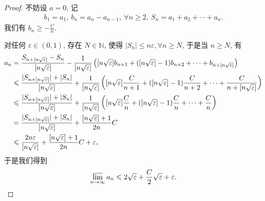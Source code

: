 \documentclass[../../main.tex]{subfiles}
\begin{document}
\begin{proof}
不妨设 $a = 0$, 记
\begin{align*}
b_1 = a_1,\ b_n = a_n - a_{n-1},\ \forall n \geqslant 2,\ S_n = a_1 + a_2 + \cdots + a_n.
\end{align*}
我们有 $b_n \geqslant -\frac{C}{n}$.

对任何 $\varepsilon \in (0,1)$, 存在 $N \in \mathbb{N}$, 使得 $|S_n| \leqslant n \varepsilon, \forall n \geqslant N$, 于是当 $n \geqslant N$, 有
\begin{align}
a_n &= \frac{S_{n + [n\sqrt{\varepsilon}]} - S_n}{[n\sqrt{\varepsilon}]} - \frac{1}{[n\sqrt{\varepsilon}]} \left( [n\sqrt{\varepsilon}] b_{n+1} + ([n\sqrt{\varepsilon}] - 1) b_{n+2} + \cdots + b_{n + [n\sqrt{\varepsilon}]} \right) \notag \\
&\leqslant \frac{|S_{n + [n\sqrt{\varepsilon}]}| + |S_n|}{[n\sqrt{\varepsilon}]} + \frac{1}{[n\sqrt{\varepsilon}]} \left( [n\sqrt{\varepsilon}] \frac{C}{n + 1} + ([n\sqrt{\varepsilon}] - 1) \frac{C}{n + 2} + \cdots + \frac{C}{n + [n\sqrt{\varepsilon}]} \right) \notag \\
&\leqslant \frac{|S_{n + [n\sqrt{\varepsilon}]}| + |S_n|}{[n\sqrt{\varepsilon}]} + \frac{1}{[n\sqrt{\varepsilon}]} \left( [n\sqrt{\varepsilon}] \frac{C}{n} + ([n\sqrt{\varepsilon}] - 1) \frac{C}{n} + \cdots + \frac{C}{n} \right) \notag \\
&= \frac{|S_{n + [n\sqrt{\varepsilon}]}| + |S_n|}{[n\sqrt{\varepsilon}]} + \frac{[n\sqrt{\varepsilon}] + 1}{2n} C \notag \\
&\leqslant \frac{2n \varepsilon}{[n\sqrt{\varepsilon}]} + \frac{[n\sqrt{\varepsilon}] + 1}{2n} C + \varepsilon, \label{eq:9.130}
\end{align}
于是我们得到
\begin{align*}
\varlimsup_{n \to \infty} a_n \leqslant 2\sqrt{\varepsilon} + \frac{C}{2}\sqrt{\varepsilon} + \varepsilon.
\end{align*}


\end{proof}
\end{document}
